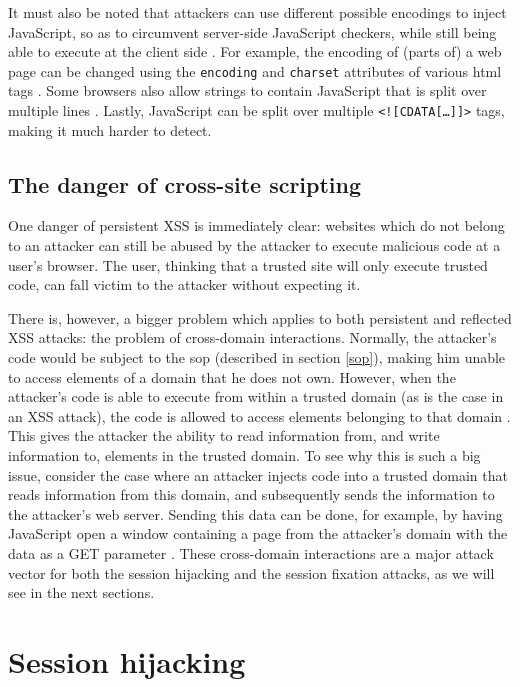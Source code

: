 It must also be noted that attackers can use different possible encodings to inject JavaScript, so as to circumvent server-side JavaScript checkers, while still being able to execute at the client side \cite{Jim2007}. For example, the encoding of (parts of) a web page can be changed using the \texttt{encoding} and \texttt{charset} attributes of various \gls{html} tags \cite{Ishida2010}. Some browsers also allow strings to contain JavaScript that is split over multiple lines \cite{Jim2007}. Lastly, JavaScript can be split over multiple  \texttt{<![CDATA[\dots]]>} tags, making it much harder to detect.

\subsection{The danger of cross-site scripting}\label{xss-problem}

One danger of persistent XSS is immediately clear: websites which do not belong to an attacker can still be abused by the attacker to execute malicious code at a user's browser. The user, thinking that a trusted site will only execute trusted code, can fall victim to the attacker without expecting it.

There is, however, a bigger problem which applies to both persistent and reflected XSS attacks: the problem of cross-domain interactions. Normally, the attacker's code would be subject to the \gls{sop} (described in section \ref{sop}), making him unable to access elements of a domain that he does not own. However, when the attacker's code is able to execute from within a trusted domain (as is the case in an XSS attack), the code is allowed to access elements belonging to that domain \cite{Klein2002}. This gives the attacker the ability to read information from, and write information to, elements in the trusted domain. To see why this is such a big issue, consider the case where an attacker injects code into a trusted domain that reads information from this domain, and subsequently sends the information to the attacker's web server. Sending this data can be done, for example, by having JavaScript open a window containing a page from the attacker's domain with the data as a GET parameter \cite{Klein2002}. These cross-domain interactions are a major attack vector for both the session hijacking and the session fixation attacks, as we will see in the next sections.

\section{Session hijacking}\label{hijacking}

